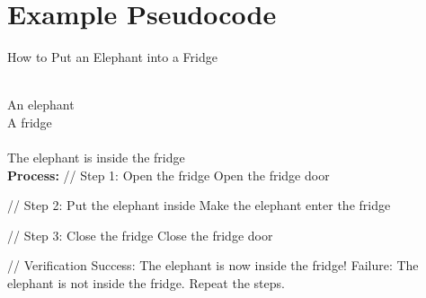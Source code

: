  \appendix	
 
 \chapter{Example Pseudocode}
 \label{example pseudocode}

\begin{breakablealgorithm}
\caption{How to Put an Elephant into a Fridge} 
\label{alg:ElephantFridge} 
\begin{algorithmic}
\REQUIRE~~\\
An elephant\\
A fridge\\

\ENSURE~~\\
The elephant is inside the fridge\\

\STATE \textbf{Process:}
\STATE // Step 1: Open the fridge
\STATE Open the fridge door

\STATE // Step 2: Put the elephant inside
\STATE Make the elephant enter the fridge

\STATE // Step 3: Close the fridge
\STATE Close the fridge door

\STATE // Verification
\STATE Success: The elephant is now inside the fridge!
\ELSE
\STATE Failure: The elephant is not inside the fridge. Repeat the steps.
\ENDIF
\end{algorithmic}
\end{breakablealgorithm}
